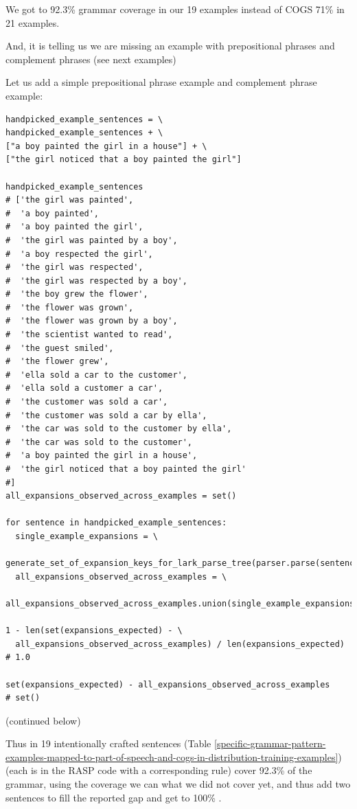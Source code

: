 \documentclass[11pt]{article}
\begin{document}
\clearpage
We got to 92.3\% grammar coverage in our 19 examples instead of COGS 71\% in 21 examples.

And, it is telling us we are missing an example with prepositional phrases and complement phrases (see next examples)

Let us add a simple prepositional phrase example and complement phrase example:
\begin{tiny}
\begin{verbatim}
handpicked_example_sentences = \
handpicked_example_sentences + \
["a boy painted the girl in a house"] + \
["the girl noticed that a boy painted the girl"]

handpicked_example_sentences
# ['the girl was painted',
#  'a boy painted',
#  'a boy painted the girl',
#  'the girl was painted by a boy',
#  'a boy respected the girl',
#  'the girl was respected',
#  'the girl was respected by a boy',
#  'the boy grew the flower',
#  'the flower was grown',
#  'the flower was grown by a boy',
#  'the scientist wanted to read',
#  'the guest smiled',
#  'the flower grew',
#  'ella sold a car to the customer',
#  'ella sold a customer a car',
#  'the customer was sold a car',
#  'the customer was sold a car by ella',
#  'the car was sold to the customer by ella',
#  'the car was sold to the customer',
#  'a boy painted the girl in a house',
#  'the girl noticed that a boy painted the girl'
#]
all_expansions_observed_across_examples = set()

for sentence in handpicked_example_sentences:
  single_example_expansions = \
    generate_set_of_expansion_keys_for_lark_parse_tree(parser.parse(sentence.lower()))
  all_expansions_observed_across_examples = \
    all_expansions_observed_across_examples.union(single_example_expansions)

1 - len(set(expansions_expected) - \
  all_expansions_observed_across_examples) / len(expansions_expected)
# 1.0

set(expansions_expected) - all_expansions_observed_across_examples
# set()
\end{verbatim}
\end{tiny}
(continued below)
\clearpage

Thus in 19 intentionally crafted sentences (Table \ref{specific-grammar-pattern-examples-mapped-to-part-of-speech-and-cogs-in-distribution-training-examples}) (each is in the RASP code with a corresponding rule) cover 92.3\% of the grammar, 
using the coverage we can what we did not cover yet, and thus add two sentences to fill the reported gap and get to 100\% .
\end{document}
